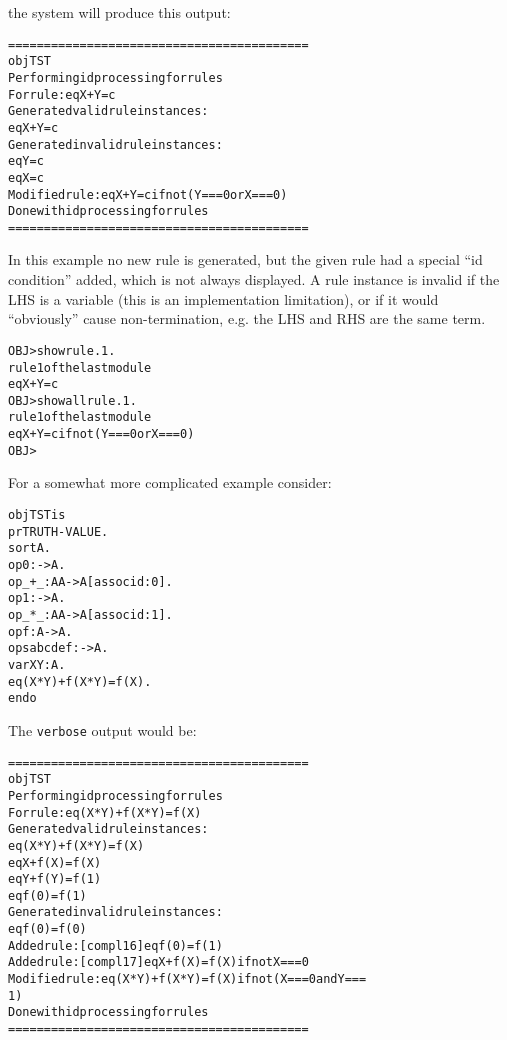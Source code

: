 the system will produce this output:

\begin{alltt}
    ==========================================
    obj TST
    Performing id processing for rules
    For rule: eq X + Y = c
      Generated valid rule instances:
      eq X + Y = c
      Generated invalid rule instances:
      eq Y = c
      eq X = c
      Modified rule: eq X + Y = c if not (Y === 0 or X === 0)
    Done with id processing for rules
    ==========================================
\end{alltt}

\noi In this example no new rule is generated, but the given rule had
a special ``id condition'' added, which is not always displayed.  A
rule instance is invalid if the LHS is a variable (this is an
implementation limitation), or if it would ``obviously'' cause
non-termination, e.g. the LHS and RHS are the same term.

\begin{alltt}
    OBJ> show rule .1 .
    rule 1 of the last module
      eq X + Y = c
    OBJ> show all rule .1 .
    rule 1 of the last module
      eq X + Y = c if not (Y === 0 or X === 0)
    OBJ> 
\end{alltt}

For a somewhat more complicated example consider:

\begin{alltt}
    obj TST is
      pr TRUTH-VALUE .
      sort A .
      op 0 : -> A .
      op _+_ : A A -> A [assoc id: 0] .
      op 1 : -> A .
      op _*_ : A A -> A [assoc id: 1] .
      op f : A -> A .
      ops a b c d e f : -> A .
      var X Y : A .
      eq (X * Y) + f(X * Y) = f(X) .
    endo
\end{alltt}

The {\tt verbose} output would be:

\begin{alltt}
    ==========================================
    obj TST
    Performing id processing for rules
    For rule: eq (X * Y) + f(X * Y) = f(X)
      Generated valid rule instances:
      eq (X * Y) + f(X * Y) = f(X)
      eq X + f(X) = f(X)
      eq Y + f(Y) = f(1)
      eq f(0) = f(1)
      Generated invalid rule instances:
      eq f(0) = f(0)
      Added rule: [compl16] eq f(0) = f(1)
      Added rule: [compl17] eq X + f(X) = f(X) if not X === 0
      Modified rule: eq (X * Y) + f(X * Y) = f(X) if not (X === 0 and Y === 
        1)
    Done with id processing for rules
    ==========================================
\end{alltt}

